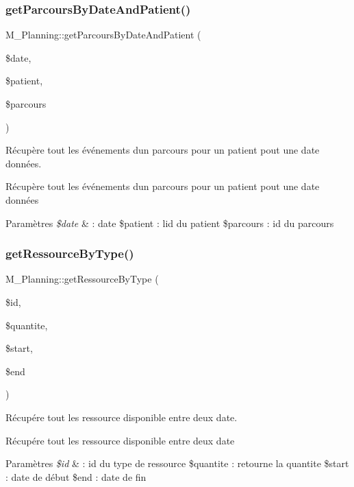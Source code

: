 \subsubsection{\texorpdfstring{get\+Parcours\+By\+Date\+And\+Patient()}{getParcoursByDateAndPatient()}}
{\footnotesize\ttfamily M\+\_\+\+Planning\+::get\+Parcours\+By\+Date\+And\+Patient (\begin{DoxyParamCaption}\item[{}]{\$date,  }\item[{}]{\$patient,  }\item[{}]{\$parcours }\end{DoxyParamCaption})}



Récupère tout les événements d\textquotesingle{}un parcours pour un patient pout une date données. 

Récupère tout les événements d\textquotesingle{}un parcours pour un patient pout une date données 
\begin{DoxyParams}{Paramètres}
{\em \$date} & \+: date \$patient \+: l\textquotesingle{}id du patient \$parcours \+: id du parcours \\
\hline
\end{DoxyParams}
\mbox{\label{class_m___planning_a9a4a5513520eb81c0d68eebea2efcbe1}} 
\subsubsection{\texorpdfstring{get\+Ressource\+By\+Type()}{getRessourceByType()}}
{\footnotesize\ttfamily M\+\_\+\+Planning\+::get\+Ressource\+By\+Type (\begin{DoxyParamCaption}\item[{}]{\$id,  }\item[{}]{\$quantite,  }\item[{}]{\$start,  }\item[{}]{\$end }\end{DoxyParamCaption})}



Récupére tout les ressource disponible entre deux date. 

Récupére tout les ressource disponible entre deux date 
\begin{DoxyParams}{Paramètres}
{\em \$id} & \+: id du type de ressource \$quantite \+: retourne la quantite \$start \+: date de début \$end \+: date de fin \\
\hline
\end{DoxyParams}
\mbox{\label{class_m___planning_a4ae35a403f5ccd0e6cc0bbaa63ba0a61}} 
